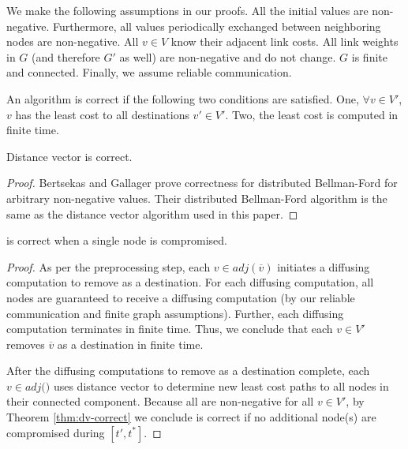 We make the following assumptions in our proofs. All the initial \dmatrix values are non-negative. Furthermore, all \minv values periodically
exchanged between neighboring nodes are non-negative. 
All $v \in V$ know their adjacent link costs. All link weights in $G$ (and therefore $G'$ as well) are non-negative and do not change.
$G$ is finite and connected. Finally, we assume reliable communication. 

\begin{define} 
An algorithm is correct if the following two conditions are satisfied. One, $\forall v \in V'$, $v$ has the least cost to all destinations $v' \in V'$.
Two, the least cost is computed in finite time.
\end{define}


\begin{theorem}
\label{thm:dv-correct}
Distance vector is correct.
\end{theorem}
\begin{proof}
Bertsekas and Gallager \cite{Gall87} prove correctness for distributed Bellman-Ford for arbitrary non-negative \dmatrix values. 
Their distributed Bellman-Ford algorithm is the same as the distance vector algorithm used in this paper. 
\end{proof}

\begin{corollary}
\label{cor:second-correct-single}
\second is correct when a single node is compromised.
\end{corollary}
\begin{proof}
As per the preprocessing step, each $v \in adj(\overline{v})$ initiates a diffusing computation to remove \bad as a destination. For each diffusing computation,
all nodes are guaranteed to receive a diffusing computation (by our reliable communication and finite graph assumptions). Further, each diffusing computation
terminates in finite time.  Thus, we conclude that each $v \in V'$ removes $\overline{v}$ as a destination in finite time.

After the diffusing computations to remove \bad as a destination complete, each 
$v \in adj($\bads$)$ uses distance vector to determine new least cost paths to all nodes in their connected component.
Because all \dmatrixv are non-negative for all $v \in V'$, by Theorem \ref{thm:dv-correct} we conclude \second is correct if no additional node(s) are compromised
during $[t',t^*]$. %
\end{proof}

